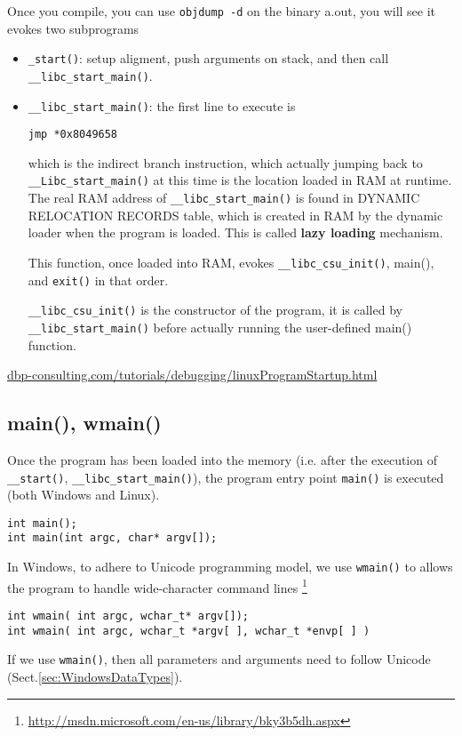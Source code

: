 Once you compile, you can use \verb!objdump -d! on the binary a.out, you will see it evokes two subprograms
\begin{itemize}
  \item \verb!_start()!: setup aligment, push arguments on stack, 
  and then call \verb!__libc_start_main()!.
  
  \item \verb!__libc_start_main()!: the first line to execute is 
  
\begin{verbatim}
jmp *0x8049658
\end{verbatim}
which is the indirect branch instruction, which actually jumping back to \verb!__Libc_start_main()! at this time
is the location loaded in RAM at runtime. The real RAM address of \verb!__libc_start_main()! is found in 
DYNAMIC RELOCATION RECORDS table, which is created in RAM by the dynamic loader when the program is loaded. This is called {\bf lazy loading} mechanism.

This function, once loaded into RAM, evokes \verb!__libc_csu_init()!, main(), and \verb!exit()! in that order.

\verb!__libc_csu_init()! is the constructor of the program, it is called by
\verb!__libc_start_main()! before actually running the user-defined main() function.

\end{itemize}

\url{dbp-consulting.com/tutorials/debugging/linuxProgramStartup.html}


\subsection{main(), wmain()}
\label{sec:main_wmain}

Once the program has been loaded into the memory (i.e. after the execution of
\verb!__start()!, \verb!__libc_start_main()!), the program entry point 
\verb!main()! is executed (both Windows and Linux).
\begin{verbatim}
int main();
int main(int argc, char* argv[]);
\end{verbatim}

In Windows, to adhere to Unicode
programming model, we use \verb!wmain()! to allows the program to handle
wide-character command lines
\footnote{\url{http://msdn.microsoft.com/en-us/library/bky3b5dh.aspx}}
\begin{verbatim}
int wmain( int argc, wchar_t* argv[]);
int wmain( int argc, wchar_t *argv[ ], wchar_t *envp[ ] )
\end{verbatim}
If we use \verb!wmain()!, then all parameters and arguments need to follow
Unicode (Sect.\ref{sec:WindowsDataTypes}).

